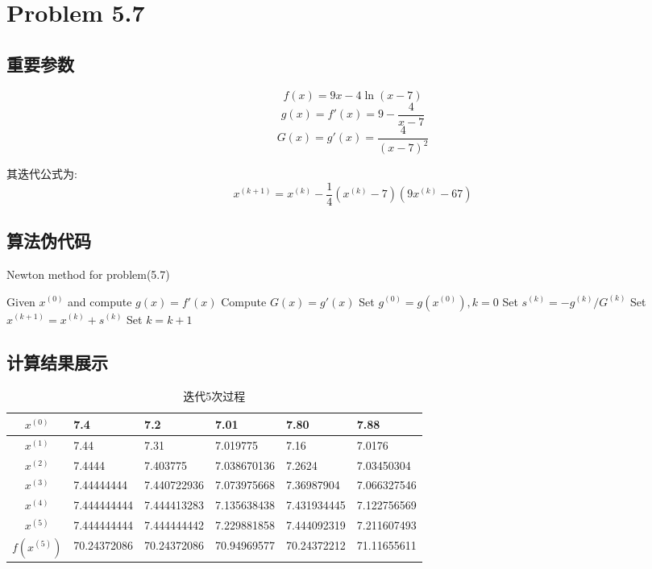 \newpage
\section{Problem 5.7}
\subsection{重要参数}
\[f(x)=9x-4\ln(x-7)\]
\[g(x)=f'(x)=9-\dfrac{4}{x-7}\]
\[G(x)=g'(x)=\dfrac{4}{(x-7)^2}\]

其迭代公式为:
\begin{equation}
x^{(k+1)}=x^{(k)}-\dfrac{1}{4}(x^{(k)}-7)(9x^{(k)}-67)
\label{eq1}
\end{equation}


\subsection{算法伪代码}
\begin{algorithm}[h]  
\caption{Newton method for problem(5.7)}  
\begin{algorithmic}[1]  
\STATE Given $x^{(0)}$ and compute $g(x)=f'(x)$
\STATE Compute $G(x)=g'(x)$
\STATE Set $g^{(0)}=g(x^{(0)}),k=0$
\STATE Set $s^{(k)}=-g^{(k)}/G^{(k)}$
\STATE Set $x^{(k+1)}=x^{(k)}+s^{(k)}$
\STATE Set $k=k+1$
\ENDWHILE
\end{algorithmic}  
\end{algorithm}  



\subsection{计算结果展示}
\begin{table}[htbp]
  \centering
  \caption{迭代5次过程}
    \begin{tabular}{clllll}
\toprule
  $x^{(0)}$&7.4  & 7.2  & 7.01 &7.80  & 7.88 \\
	\midrule
   $x^{(1)}$& 7.44  & 7.31  & 7.019775 & 7.16  & 7.0176 \\
    $x^{(2)}$&7.4444 & 7.403775 & 7.038670136 & 7.2624 & 7.03450304 \\
    $x^{(3)}$&7.44444444 & 7.440722936 & 7.073975668 & 7.36987904 & 7.066327546 \\
   $ x^{(4)}$&7.444444444 & 7.444413283 & 7.135638438 & 7.431934445 & 7.122756569 \\
    $x^{(5)}$&7.444444444 & 7.444444442 & 7.229881858 & 7.444092319 & 7.211607493 \\
	\midrule
    $f(x^{(5)})$&70.24372086 & 70.24372086 & 70.94969577 & 70.24372212 & 71.11655611 \\
	\bottomrule
    \end{tabular}%
  \label{tab:addlabel}%
\end{table}%

